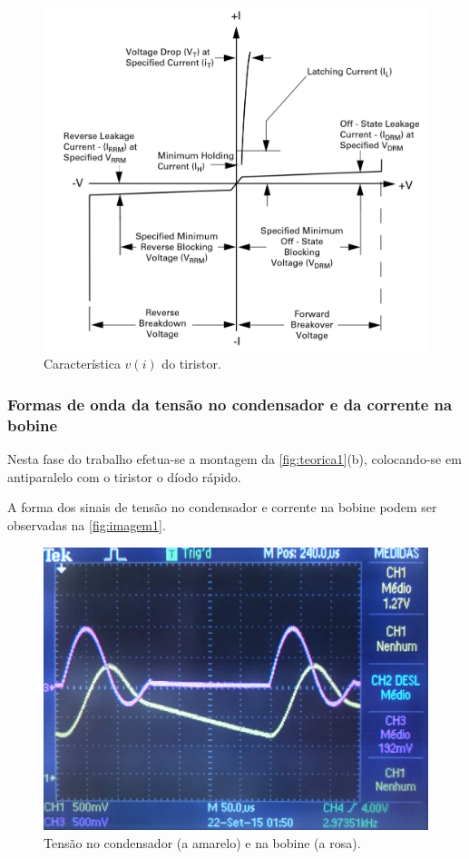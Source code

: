 \documentclass[a4paper,11pt]{article}
\numberwithin{equation}{section}
\begin{document}
\begin{figure}[h]
	\centering
	\includegraphics[keepaspectratio=true, scale=0.33]{teoricas/caracteristica}
	\caption{Característica $v(i)$ do tiristor.}
	\label{fig:caracteristica}
	\vspace{-0.8em}
\end{figure}

\subsubsection{Formas de onda da tensão no condensador e da corrente na bobine}

Nesta fase do trabalho efetua-se a montagem da \autoref{fig:teorica1}(b), colocando-se em antiparalelo com o tiristor o díodo rápido. 

A forma dos sinais de tensão no condensador e corrente na bobine podem ser observadas na \autoref{fig:imagem1}.

\begin{figure}[h]
	\centering
	\includegraphics[keepaspectratio=true, scale=0.17]{img/imagem1}
	\caption{Tensão no condensador (a amarelo) e na bobine (a rosa).}
	\label{fig:imagem1}
	\vspace{-0.8em}
\end{figure}
\end{document}
